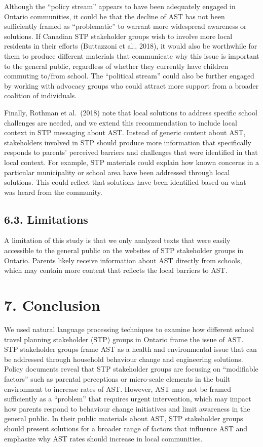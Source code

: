 \documentclass[]{elsarticle} %
\begin{document}
Although the ``policy stream'' appears to have been adequately engaged
in Ontario communities, it could be that the decline of AST has not been
sufficiently framed as ``problematic'' to warrant more widespread
awareness or solutions. If Canadian STP stakeholder groups wish to
involve more local residents in their efforts (Buttazzoni et al., 2018),
it would also be worthwhile for them to produce different materials that
communicate why this issue is important to the general public,
regardless of whether they currently have children commuting to/from
school. The ``political stream'' could also be further engaged by
working with advocacy groups who could attract more support from a
broader coalition of individuals.

Finally, Rothman et al.~(2018) note that local solutions to address
specific school challenges are needed, and we extend this recommendation
to include local context in STP messaging about AST. Instead of generic
content about AST, stakeholders involved in STP should produce more
information that specifically responds to parents' perceived barriers
and challenges that were identified in that local context. For example,
STP materials could explain how known concerns in a particular
municipality or school area have been addressed through local solutions.
This could reflect that solutions have been identified based on what was
heard from the community.

\hypertarget{limitations}{%
\subsection{6.3. Limitations}\label{limitations}}

A limitation of this study is that we only analyzed texts that were
easily accessible to the general public on the websites of STP
stakeholder groups in Ontario. Parents likely receive information about
AST directly from schools, which may contain more content that reflects
the local barriers to AST.

\hypertarget{conclusion}{%
\section{7. Conclusion}\label{conclusion}}

We used natural language processing techniques to examine how different
school travel planning stakeholder (STP) groups in Ontario frame the
issue of AST. STP stakeholder groups frame AST as a health and
environmental issue that can be addressed through household behaviour
change and engineering solutions. Policy documents reveal that STP
stakeholder groups are focusing on ``modifiable factors'' such as
parental perceptions or micro-scale elements in the built environment to
increase rates of AST. However, AST may not be framed sufficiently as a
``problem'' that requires urgent intervention, which may impact how
parents respond to behaviour change initiatives and limit awareness in
the general public. In their public materials about AST, STP stakeholder
groups should present solutions for a broader range of factors that
influence AST and emphasize why AST rates should increase in local
communities.
\end{document}

